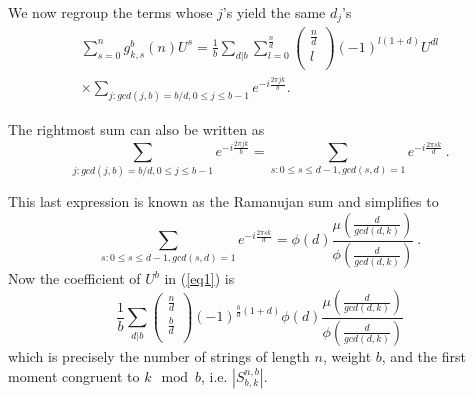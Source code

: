 \documentclass[12pt]{article} \pagestyle{plain} \topmargin
\begin{document}
We now regroup the terms whose $j$'s yield the same $d_j$'s
\begin{eqnarray*}
\sum_{s=0}^n g^b_{k,s}(n)U^s=\frac{1}{b}\sum_{d|b}
\sum_{l=0}^{\frac{n}{d}} \left(
\begin{array}{c}
                             \frac{n}{d} \\
                             l \\
                           \end{array}
                           \right)(-1)^{l(1+d)}U^{d l}\\ \times
\sum_{j: gcd(j,b)=b/d, 0 \leq j\leq b-1}e^{-i\frac{2\pi
                           j k}{b}}.
\end{eqnarray*}

The rightmost sum can also be written as
\begin{equation}
\sum_{j:gcd(j,b)=b/d, 0 \leq j\leq b-1}e^{-i\frac{2\pi
                           j k}{b}}= \sum_{s:0 \leq s\leq d-1,gcd(s,d)=1}
e^{-i\frac{2\pi
                           s k}{d}}~.
\end{equation}


This last expression is known as the Ramanujan sum \cite{apostol}
and simplifies to \begin{equation}\sum_{s:0 \leq s\leq
d-1,gcd(s,d)=1}e^{-i\frac{2\pi
                           s k}{d}}=\phi(d)
\frac{\mu\left(\frac{d}{gcd(d,k)}\right)}{\phi\left(\frac{d}{gcd(d,k)}\right)}~.
                           \end{equation}
Now the coefficient of $U^b$ in (\ref{eq1}) is
\begin{equation}\label{eq2}
\frac{1}{b} \sum_{d|b} \left( \begin{array}{c}
                             \frac{n}{d} \\
                             \frac{b}{d} \\
                           \end{array} \right)(-1)^{\frac{b}{d}(1+d)}\phi(d) \frac{\mu\left(\frac{d}{gcd(d,k)}\right)}{\phi\left(\frac{d}{gcd(d,k)}\right)}
\end{equation}
which is precisely the number of strings of length $n$, weight $b$,
and the first moment congruent to $k \mod b$, i.e.
$|S_{b,k}^{n,b}|$.
\end{document}
